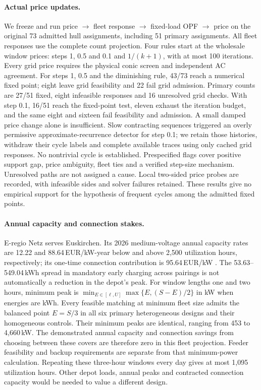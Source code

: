 \documentclass[11pt]{article}
\theoremstyle{definition}\newtheorem{definition}[theorem]{Definition}
\theoremstyle{remark}\newtheorem{remark}[theorem]{Remark}
\begin{document}
\paragraph{Actual price updates.}
We freeze and run price $\to$ fleet response $\to$ fixed-load OPF $\to$
price on the original 73 admitted hull assignments, including 51 primary
assignments. All fleet responses use the complete count projection. Four
rules start at the wholesale window prices: steps 1, 0.5 and 0.1 and
$1/(k+1)$, with at most 100 iterations. Every grid price requires the
physical conic screen and independent AC agreement. For steps 1, 0.5 and
the diminishing rule, 43/73 reach a numerical fixed point; eight leave grid
feasibility and 22 fail grid admission. Primary counts are 27/51 fixed,
eight infeasible responses and 16 unresolved grid checks. With step 0.1,
16/51 reach the fixed-point test, eleven exhaust the iteration budget,
and the same eight and sixteen fail feasibility and admission. A small damped
price change alone is insufficient. Slow contracting sequences triggered
an overly permissive approximate-recurrence detector for step 0.1; we retain
those histories, withdraw their cycle labels and complete available traces
using only cached grid responses. No nontrivial cycle is established.
Prespecified flags cover positive support gap, price ambiguity, fleet ties
and a verified step-size mechanism. Unresolved paths are not assigned a
cause. Local two-sided price probes are recorded, with infeasible sides and
solver failures retained. These results give no empirical support for the
hypothesis of frequent cycles among the admitted fixed points.

\paragraph{Annual capacity and connection stakes.}
E-regio Netz serves Euskirchen. Its 2026 medium-voltage annual capacity
rates are 12.22 and 88.64\,EUR/kW-year below and above 2,500 utilization
hours, respectively; its one-time connection contribution is
95.64\,EUR/kW \citep{eregio2026network,eregio2026bkz}.
The 53.63--549.04\,kWh spread in mandatory early charging across pairings
is not automatically a reduction in the depot's peak. For window lengths
one and two hours, minimum peak is
$\min_{E\in[\ell,U]}\max\{E,(S-E)/2\}$ in kW when energies are kWh.
Every feasible matching at minimum fleet size admits the balanced point
$E=S/3$ in all six
primary heterogeneous designs and their homogeneous controls. Their minimum
peaks are identical, ranging from 453 to 4,660\,kW. The demonstrated annual
capacity and connection savings from choosing between these covers are
therefore zero in this fleet projection. Feeder feasibility and backup
requirements are separate from that minimum-power calculation. Repeating these three-hour windows every day gives at most
1,095 utilization hours. Other depot loads, annual peaks and contracted
connection capacity would be needed to value a different design.
\end{document}
